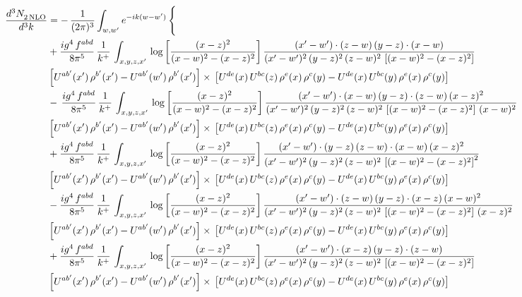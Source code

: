 \documentclass[9pt]{article}
\numberwithin{equation}{section}
\begin{document}
\begin{align}
   \frac{d^{3}N_{2\,\rm NLO}^{\rm}}{d^{3}k}  & =  -\,\frac{1}{(2\pi)^{3}}  \int_{w, w^\prime} e^{-ik(w-w^\prime)}\, \Bigg\{\notag \\ &   + \frac{ig^{4}\, f^{abd}}{8\pi^{5}}\, \frac{1}{k^{+}}\, \int_{x,y,z,x'}\,\log{\left[\frac{(x-z)^{2}}{(x-w)^{2}-(x-z)^{2}}\right]}\,\frac{(x'-w')\cdot (z-w)\, (y-z)\cdot (x-w)}{(x'-w')^{2}\, (y-z)^{2}\, (z-w)^{2}\,\left[(x-w)^{2}-(x-z)^{2}\right]}\, \notag \\ & \left[U^{ab'}(x')\,\rho^{b'}(x')-U^{ab'}(w')\, \rho^{b'}(x')\right]\times\,\left[U^{de}(x)\,U^{bc}(z)\, \rho^{e}(x)\,\rho^{c}(y)-U^{de}(x)\,U^{bc}(y)\,\rho^{e}(x)\,\rho^{c}(y)\right] \notag \\
& -\,\frac{ig^{4}\, f^{abd}}{8\pi^{5}}\, \frac{1}{k^{+}}\, \int_{x,y,z,x'}\,\log{\left[\frac{(x-z)^{2}}{(x-w)^{2}-(x-z)^{2}}\right]}\,\frac{(x'-w')\cdot (x-w)\, (y-z)\cdot(z-w)\,(x-z)^{2}}{(x'-w')^{2}\, (y-z)^{2}\, (z-w)^{2}\,\left[(x-w)^{2}-(x-z)^{2}\right]\,(x-w)^{2}}\, \notag \\ & \left[U^{ab'}(x')\,\rho^{b'}(x')-U^{ab'}(w')\, \rho^{b'}(x')\right]\times\,\left[U^{de}(x)\,U^{bc}(z)\, \rho^{e}(x)\,\rho^{c}(y)-U^{de}(x)\,U^{bc}(y)\,\rho^{e}(x)\,\rho^{c}(y)\right] \notag \\
& +\frac{ig^{4}\, f^{abd}}{8\pi^{5}}\, \frac{1}{k^{+}}\, \int_{x,y,z,x'}\,\log{\left[\frac{(x-z)^{2}}{(x-w)^{2}-(x-z)^{2}}\right]}\,\frac{(x'-w')\cdot  (y-z)\, (z-w)\cdot (x-w)\, (x-z)^{2}}{(x'-w')^{2}\, (y-z)^{2}\, (z-w)^{2}\,\left[(x-w)^{2}-(x-z)^{2}\right]^{2}}\, \notag \\ & \left[U^{ab'}(x')\,\rho^{b'}(x')-U^{ab'}(w')\, \rho^{b'}(x')\right]\times\,\left[U^{de}(x)\,U^{bc}(z)\, \rho^{e}(x)\,\rho^{c}(y)-U^{de}(x)\,U^{bc}(y)\,\rho^{e}(x)\,\rho^{c}(y)\right] \notag \\
& - \frac{ig^{4}\, f^{abd}}{8\pi^{5}}\, \frac{1}{k^{+}}\, \int_{x,y,z,x'}\,\log{\left[\frac{(x-z)^{2}}{(x-w)^{2}-(x-z)^{2}}\right]}\,\frac{(x'-w')\cdot (z-w)\, (y-z)\cdot (x-z)\, (x-w)^{2}}{(x'-w')^{2}\, (y-z)^{2}\, (z-w)^{2}\,\left[(x-w)^{2} - (x-z)^{2}\right]\, (x-z)^{2}}\, \notag \\ & \left[U^{ab'}(x')\,\rho^{b'}(x')-U^{ab'}(w')\, \rho^{b'}(x')\right]\times\,\left[U^{de}(x)\,U^{bc}(z)\, \rho^{e}(x)\,\rho^{c}(y)-U^{de}(x)\,U^{bc}(y)\,\rho^{e}(x)\,\rho^{c}(y)\right] \notag \\
& +\frac{ig^{4}\, f^{abd}}{8\pi^{5}}\, \frac{1}{k^{+}}\, \int_{x,y,z,x'}\,\log{\left[\frac{(x-z)^{2}}{(x-w)^{2}-(x-z)^{2}}\right]}\,\frac{(x'-w')\cdot (x-z)\, (y-z)\cdot (z-w)}{(x'-w')^{2}\, (y-z)^{2}\, (z-w)^{2}\,\left[(x-w)^{2} -(x-z)^{2}\right]}\, \notag \\ & \left[U^{ab'}(x')\,\rho^{b'}(x')-U^{ab'}(w')\, \rho^{b'}(x')\right]\times\,\left[U^{de}(x)\,U^{bc}(z)\, \rho^{e}(x)\,\rho^{c}(y)-U^{de}(x)\,U^{bc}(y)\,\rho^{e}(x)\,\rho^{c}(y)\right] \notag \\

\end{align}
\end{document}
